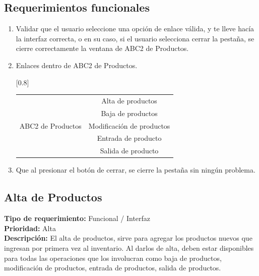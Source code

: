 \documentclass[a4paper,DIV=12]{scrreprt}
\begin{document}
\subsection*{Requerimientos funcionales}
\begin{enumerate}
	\item{Validar que el usuario seleccione una opción de enlace válida, y te lleve hacía la interfaz correcta, o en su caso, si el usuario selecciona cerrar la pestaña, se cierre correctamente la ventana de ABC2 de Productos.}
	\item{Enlaces dentro de ABC2 de Productos. }
	
\begin{table}[ht]
\scalebox{1}[0.8]{%
\begin{tabular}{|c|c|}
\hline
\multirow{5}{*}{ABC2 de Productos} & Alta de productos           \\ \cline{2-2} 
                                   & Baja de productos           \\ \cline{2-2} 
                                   & Modificación de   productos \\ \cline{2-2} 
                                   & Entrada de producto         \\ \cline{2-2} 
                                   & Salida de producto          \\ \hline
\end{tabular}%
}
\end{table}

	\item{Que al presionar el botón de cerrar, se cierre la pestaña sin ningún problema. }
	
\end{enumerate}

\newpage
\setcounter{chapter}{1}
\setcounter{section}{1}
\setcounter{subsection}{-1}
\subsection{Alta de Productos}
\noindent
\textbf{Tipo de requerimiento:} Funcional / Interfaz\\
\textbf{Prioridad:} Alta\\

\textbf{Descripción:} El alta de productos, sirve para agregar los productos nuevos que ingresan por primera vez al inventario. Al darlos de alta, deben estar disponibles para todas las operaciones que los involucran como baja de productos, modificación de productos, entrada de productos, salida de productos.\\
\end{document}
